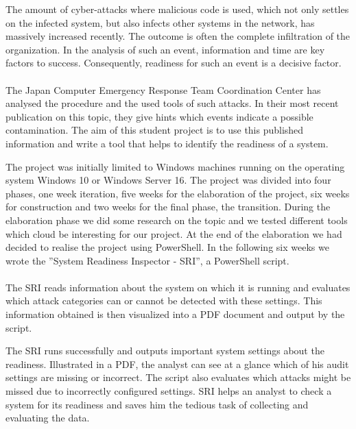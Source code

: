 \thispagestyle{plain}
\renewcommand\section{\stdsection}
\thispagestyle{plain}
The amount of cyber-attacks where malicious code is used, which not only settles on the infected system, but also infects other systems in the network, has massively increased recently. The outcome is often the complete infiltration of the organization. In the analysis of such an event, information and time are key factors to success. Consequently, readiness for such an event is a decisive factor. \\\\
The Japan Computer Emergency Response Team Coordination Center has analysed the procedure and the used tools of such attacks. In their most recent publication on this topic, they give hints which events indicate a possible contamination. The aim of this student project is to use this published information and write a tool that helps to identify the readiness of a system.

\thispagestyle{plain}
The project was initially limited to Windows machines running on the operating system Windows 10 or Windows Server 16. The project was divided into four phases, one week iteration, five weeks for the elaboration of the project, six weeks for construction and two weeks for the final phase, the transition. During the elaboration phase we did some research on the topic and we tested different tools which cloud be interesting for our project. At the end of the elaboration we had decided to realise the project using PowerShell. In the following six weeks we wrote the ''System Readiness Inspector - SRI'', a PowerShell script. \\\\
The SRI reads information about the system on which it is running and evaluates which attack categories can or cannot be detected with these settings. This information obtained is then visualized into a PDF document and output by the script.

\thispagestyle{plain}
The SRI runs successfully and outputs important system settings about the readiness. Illustrated in a PDF, the analyst can see at a glance which of his audit settings are missing or incorrect. The script also evaluates which attacks might be missed due to incorrectly configured settings. SRI helps an analyst to check a system for its readiness and saves him the tedious task of collecting and evaluating the data.

